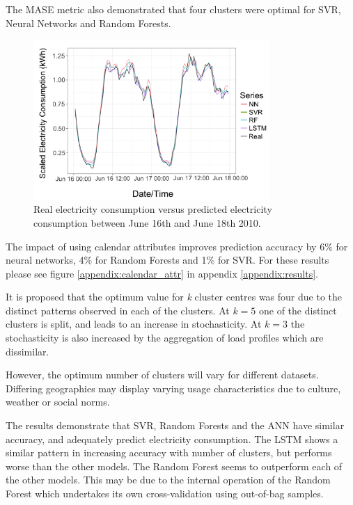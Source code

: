 The MASE metric also demonstrated that four clusters were optimal for SVR, Neural Networks and Random Forests.

\begin{figure}
	\centering
	\includegraphics[width=0.8\textwidth]{Chapter5/figures/short-term-forecasting/actual_vs_predicted_enlarged.png}
	\caption{Real electricity consumption versus predicted electricity consumption between June 16th and June 18th 2010.}
	\label{fig:act_vs_pred}
\end{figure}

The impact of using calendar attributes improves prediction accuracy by 6\% for neural networks, 4\% for Random Forests and 1\% for SVR. For these results please see figure \ref{appendix:calendar_attr} in appendix \ref{appendix:results}.

It is proposed that the optimum value for \textit{k} cluster centres was four due to the distinct patterns observed in each of the clusters. At $k=5$ one of the distinct clusters is split, and leads to an increase in stochasticity. At $k=3$ the stochasticity is also increased by the aggregation of load profiles which are dissimilar. %

However, the optimum number of clusters will vary for different datasets. Differing geographies may display varying usage characteristics due to culture, weather or social norms.

The results demonstrate that SVR, Random Forests and the ANN have similar accuracy, and adequately predict electricity consumption. The LSTM shows a similar pattern in increasing accuracy with number of clusters, but performs worse than the other models. The Random Forest seems to outperform each of the other models. This may be due to the internal operation of the Random Forest which undertakes its own cross-validation using out-of-bag samples. 


